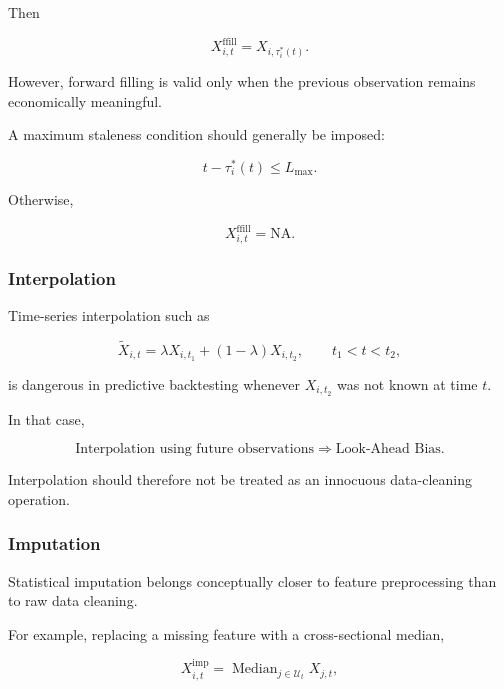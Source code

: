 \documentclass[11pt,a4paper]{article}
\begin{document}
Then

\begin{equation}
X_{i,t}^{\mathrm{ffill}}
=
X_{i,\tau_i^*(t)}.
\end{equation}

However, forward filling is valid only when the previous observation remains
economically meaningful.

A maximum staleness condition should generally be imposed:

\begin{equation}
\boxed{
t-\tau_i^*(t)
\leq
L_{\max}.
}
\end{equation}

Otherwise,

\begin{equation}
X_{i,t}^{\mathrm{ffill}}
=
\mathrm{NA}.
\end{equation}


\subsubsection{Interpolation}

Time-series interpolation such as

\begin{equation}
\widetilde{X}_{i,t}
=
\lambda X_{i,t_1}
+
(1-\lambda)X_{i,t_2},
\qquad
t_1<t<t_2,
\end{equation}

is dangerous in predictive backtesting whenever $X_{i,t_2}$ was not known at
time $t$.

In that case,

\begin{equation}
\boxed{
\text{Interpolation using future observations}
\Rightarrow
\text{Look-Ahead Bias}.
}
\end{equation}

Interpolation should therefore not be treated as an innocuous data-cleaning
operation.


\subsubsection{Imputation}

Statistical imputation belongs conceptually closer to feature preprocessing
than to raw data cleaning.

For example, replacing a missing feature with a cross-sectional median,

\begin{equation}
X_{i,t}^{\mathrm{imp}}
=
\operatorname{Median}_{j\in\mathcal{U}_t}
X_{j,t},
\end{equation}
\end{document}
